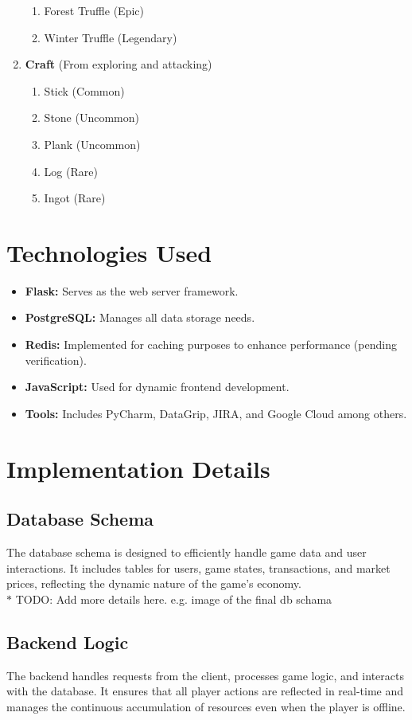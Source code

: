 \documentclass[12pt]{article}
\begin{document}
\begin{enumerate}
\begin{enumerate}
        \item Forest Truffle (Epic)
        \item Winter Truffle (Legendary)
    \end{enumerate}
    \item \textbf{Craft} (From exploring and attacking)
    \begin{enumerate}
        \item Stick (Common)
        \item Stone (Uncommon)
        \item Plank (Uncommon)
        \item Log (Rare)
        \item Ingot (Rare)
    \end{enumerate}
\end{enumerate}

\section{Technologies Used}
\begin{itemize}
    \item \textbf{Flask:} Serves as the web server framework.
    \item \textbf{PostgreSQL:} Manages all data storage needs.
    \item \textbf{Redis:} Implemented for caching purposes to enhance performance (pending verification).
    \item \textbf{JavaScript:} Used for dynamic frontend development.
    \item \textbf{Tools:} Includes PyCharm, DataGrip, JIRA, and Google Cloud among others.
\end{itemize}

\section{Implementation Details}
\subsection{Database Schema}
The database schema is designed to efficiently handle game data and user interactions. It includes tables for users, game states, transactions, and market prices, reflecting the dynamic nature of the game's economy.
\\ $\ast$ TODO: Add more details here. e.g. image of the final db schama

\subsection{Backend Logic}
The backend handles requests from the client, processes game logic, and interacts with the database. It ensures that all player actions are reflected in real-time and manages the continuous accumulation of resources even when the player is offline.
\end{document}
